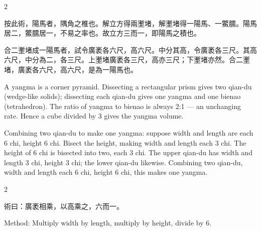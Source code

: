 \documentclass[10pt,a4paper]{article}
\begin{document}
\begin{paracol}{2}

\begin{leftcolumn*}
\begin{commentarybi}
按此術，陽馬者，隅角之椎也。解立方得兩壍堵，解壍堵得一陽馬、一鱉臑。陽馬居二，鱉臑居一，不易之率也。故立方三而一，即陽馬之積也。

合二壍堵成一陽馬者，試令廣袤各六尺，高六尺。中分其高，令廣袤各三尺。其高六尺，中分為二，各三尺。上壍堵廣袤各三尺，高亦三尺；下壍堵亦然。合二壍堵，廣袤各六尺，高六尺，是為一陽馬也。
\end{commentarybi}
\end{leftcolumn*}

\begin{rightcolumn*}
\begin{commentarybi}
A yangma is a corner pyramid. Dissecting a rectangular prism gives two qian-du (wedge-like solids); dissecting each qian-du gives one yangma and one bienao (tetrahedron). The ratio of yangma to bienao is always 2:1 --- an unchanging rate. Hence a cube divided by 3 gives the yangma volume.

Combining two qian-du to make one yangma: suppose width and length are each 6 chi, height 6 chi. Bisect the height, making width and length each 3 chi. The height of 6 chi is bisected into two, each 3 chi. The upper qian-du has width and length 3 chi, height 3 chi; the lower qian-du likewise. Combining two qian-du, width and length each 6 chi, height 6 chi, this makes one yangma.
\end{commentarybi}
\end{rightcolumn*}

\end{paracol}

\vspace{0.2cm}

\begin{paracol}{2}

\begin{leftcolumn*}
\begin{methodbi}
術曰：廣袤相乘，以高乘之，六而一。
\end{methodbi}
\end{leftcolumn*}

\begin{rightcolumn*}
\begin{methodbi}
Method: Multiply width by length, multiply by height, divide by 6.
\end{methodbi}
\end{rightcolumn*}

\end{paracol}
\end{document}
